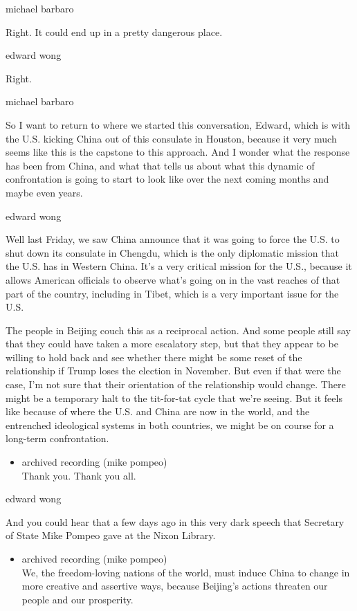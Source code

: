 michael barbaro

Right. It could end up in a pretty dangerous place.

edward wong

Right.

michael barbaro

So I want to return to where we started this conversation, Edward, which
is with the U.S. kicking China out of this consulate in Houston, because
it very much seems like this is the capstone to this approach. And I
wonder what the response has been from China, and what that tells us
about what this dynamic of confrontation is going to start to look like
over the next coming months and maybe even years.

edward wong

Well last Friday, we saw China announce that it was going to force the
U.S. to shut down its consulate in Chengdu, which is the only diplomatic
mission that the U.S. has in Western China. It's a very critical mission
for the U.S., because it allows American officials to observe what's
going on in the vast reaches of that part of the country, including in
Tibet, which is a very important issue for the U.S.

The people in Beijing couch this as a reciprocal action. And some people
still say that they could have taken a more escalatory step, but that
they appear to be willing to hold back and see whether there might be
some reset of the relationship if Trump loses the election in November.
But even if that were the case, I'm not sure that their orientation of
the relationship would change. There might be a temporary halt to the
tit-for-tat cycle that we're seeing. But it feels like because of where
the U.S. and China are now in the world, and the entrenched ideological
systems in both countries, we might be on course for a long-term
confrontation.

\begin{itemize}
\tightlist
\item
  archived recording (mike pompeo)\\
  Thank you. Thank you all.
\end{itemize}

edward wong

And you could hear that a few days ago in this very dark speech that
Secretary of State Mike Pompeo gave at the Nixon Library.

\begin{itemize}
\tightlist
\item
  archived recording (mike pompeo)\\
  We, the freedom-loving nations of the world, must induce China to
  change in more creative and assertive ways, because Beijing's actions
  threaten our people and our prosperity.
\end{itemize}

